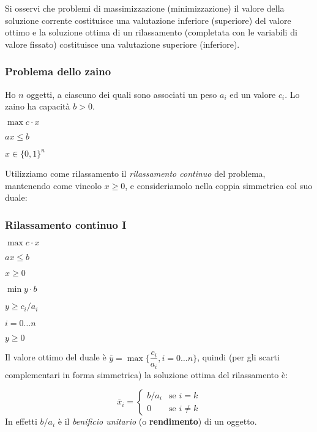 \documentclass[a4paper,11pt]{book}
\theoremstyle{break}
\begin{document}
  Si osservi che problemi di massimizzazione (minimizzazione) il valore della soluzione corrente costituisce una valutazione inferiore (superiore) del valore ottimo e la soluzione ottima di un rilassamento (completata con le variabili di valore fissato) costituisce una valutazione superiore (inferiore).
  
\subsubsection*{Problema dello zaino}
Ho $n$ oggetti, a ciascuno dei quali sono associati un peso $a_i$ ed un valore $c_i$. Lo zaino ha capacità $b>0$.

\begin{center}
 $\max c \cdot x$
 
 $a x \leq b$
 
 $x \in \{0, 1\}^{n}$
\end{center}
Utilizziamo come rilassamento il \emph{rilassamento continuo} del problema, mantenendo come vincolo $x \geq 0$, e consideriamolo nella coppia simmetrica col suo duale:\medskip

\subsubsection*{Rilassamento continuo I}
\begin{multicols}{2}
 \begin{center}
 $\max c \cdot x$
 
 $a x \leq b$
 
 $x \geq 0$
\end{center}

\begin{center}
 $\min y \cdot b$
 
 $y \geq c_i/a_i$
 
  {\scriptsize$i = 0\hdots n$}
 
 $y \geq 0$
\end{center}
\end{multicols}

Il valore ottimo del duale è $\bar y = \max\Big\{\dfrac{c_i}{a_i}, i = 0\hdots n\Big\}$, quindi (per gli scarti complementari in forma simmetrica) la soluzione ottima del rilassamento è:

\[\bar x_i = \begin{cases}
              b/a_i &\text{se $i = k$}\\
              0 &\text{se $i \neq k$}
             \end{cases}
\]
In effetti $b/a_i$ è il \emph{benificio unitario} (o \textbf{rendimento}) di un oggetto.
\end{document}
